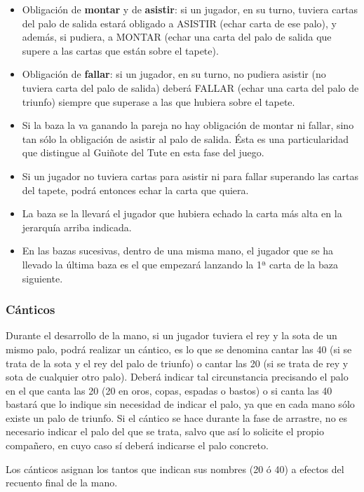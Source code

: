 \documentclass{article}
\begin{document}
\begin{itemize}
	\item Obligación de \textbf{montar} y de \textbf{asistir}: si un jugador, en su turno, tuviera cartas del palo de salida estará obligado a ASISTIR (echar carta de ese palo), y además, si pudiera, a MONTAR (echar una carta del palo de salida que supere a las cartas que están sobre el tapete).
	\item Obligación de \textbf{fallar}: si un jugador, en su turno, no pudiera asistir (no tuviera carta del palo de salida) deberá FALLAR (echar una carta del palo de triunfo) siempre que superase a las que hubiera sobre el tapete.
	\item Si la baza la va ganando la pareja no hay obligación de montar ni fallar, sino tan sólo la obligación de asistir al palo de salida. Ésta es una particularidad que distingue al Guiñote del Tute en esta fase del juego.
	\item Si un jugador no tuviera cartas para asistir ni para fallar superando las cartas del tapete, podrá entonces echar la carta que quiera.
	\item La baza se la llevará el jugador que hubiera echado la carta más alta en la jerarquía arriba indicada.
	\item En las bazas sucesivas, dentro de una misma mano, el jugador que se ha llevado la última baza es el que empezará lanzando la 1ª carta de la baza siguiente.
\end{itemize}

\subsubsection*{Cánticos}

Durante el desarrollo de la mano, si un jugador tuviera el rey y la sota de un mismo palo, podrá realizar un cántico, es lo que se denomina cantar las 40 (si se trata de la sota y el rey del palo de triunfo) o cantar las 20 (si se trata de rey y sota de cualquier otro palo). Deberá indicar tal circunstancia precisando el palo en el que canta las 20 (20 en oros, copas, espadas o bastos) o si canta las 40 bastará que lo indique sin necesidad de indicar el palo, ya que en cada mano sólo existe un palo de triunfo. Si el cántico se hace durante la fase de arrastre, no es necesario indicar el palo del que se trata, salvo que así lo solicite el propio compañero, en cuyo caso sí deberá indicarse el palo concreto.

Los cánticos asignan los tantos que indican sus nombres (20 ó 40) a efectos del recuento final de la mano.
\end{document}
